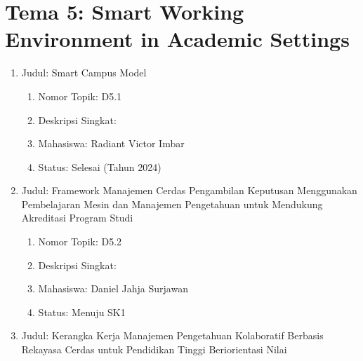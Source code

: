 \documentclass[
  letterpaper,
  DIV=11,
  numbers=noendperiod]{scrreprt}
\providecommand{\tightlist}{%
  \setlength{\itemsep}{0pt}\setlength{\parskip}{0pt}}
\begin{document}
\section{Tema 5: Smart Working Environment in Academic
Settings}\label{tema-5-smart-working-environment-in-academic-settings}

\begin{enumerate}
\def\labelenumi{\arabic{enumi}.}
\tightlist
\item
  Judul: Smart Campus Model

  \begin{enumerate}
  \def\labelenumii{\arabic{enumii}.}
  \tightlist
  \item
    Nomor Topik: D5.1
  \item
    Deskripsi Singkat:
  \item
    Mahasiswa: Radiant Victor Imbar
  \item
    Status: Selesai (Tahun 2024)
  \end{enumerate}
\item
  Judul: Framework Manajemen Cerdas Pengambilan Keputusan Menggunakan
  Pembelajaran Mesin dan Manajemen Pengetahuan untuk Mendukung
  Akreditasi Program Studi

  \begin{enumerate}
  \def\labelenumii{\arabic{enumii}.}
  \tightlist
  \item
    Nomor Topik: D5.2
  \item
    Deskripsi Singkat:
  \item
    Mahasiswa: Daniel Jahja Surjawan
  \item
    Status: Menuju SK1
  \end{enumerate}
\item
  Judul: Kerangka Kerja Manajemen Pengetahuan Kolaboratif Berbasis
  Rekayasa Cerdas untuk Pendidikan Tinggi Beriorientasi Nilai


\end{enumerate}
\end{document}
